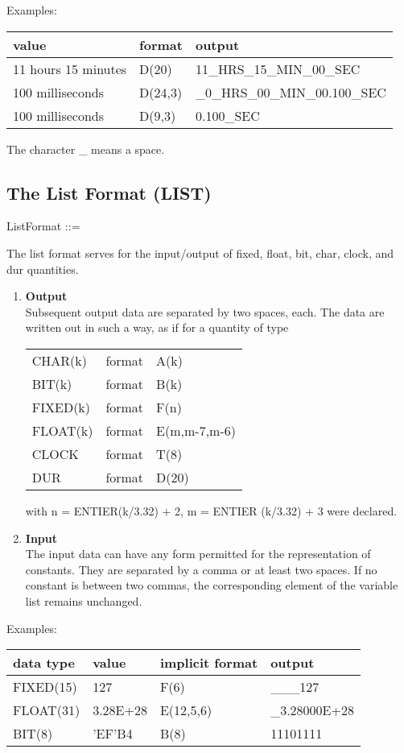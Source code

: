 Examples:

\begin{tabular}{lll}
value               & format  & output \\ \hline
11 hours 15 minutes & D(20)   & 11\_HRS\_15\_MIN\_00\_SEC \\
100 milliseconds    & D(24,3) & \_0\_HRS\_00\_MIN\_00.100\_SEC \\
100 milliseconds    & D(9,3) & 0.100\_SEC
\end{tabular}

The character \_ means a space.

\subsection{The List Format (LIST)}    %
\label{sec_dation_list_format}

ListFormat ::=\\

The list format serves for the input/output of fixed, float, bit, char,
clock, and dur quantities.
\begin{enumerate}
\item {\bf Output}\\
Subsequent output data are separated by two spaces, each. The data are
written out in such a way, as if for a quantity of type

\begin{tabular}{lll}
CHAR(k)  & format & A(k)\\
BIT(k)   & format & B(k)\\
FIXED(k) & format & F(n)\\
FLOAT(k) & format & E(m,m-7,m-6)\\
CLOCK    & format & T(8)\\
DUR      & format & D(20)
\end{tabular}

with n = ENTIER(k/3.32) + 2, m = ENTIER (k/3.32) + 3 were
declared.
\item {\bf Input}\\
The input data can have any form permitted for the representation of
constants. They are separated by a comma or at least two spaces. If no
constant is between two commas, the corresponding element of the
variable list remains unchanged.
\end{enumerate}

Examples:

\begin{tabular}{llll}
data type & value    & implicit format & output \\ \hline
FIXED(15) & 127      & F(6)            & \_\_\_127 \\
FLOAT(31) & 3.28E+28 & E(12,5,6)       & \_3.28000E+28\\
BIT(8)    & 'EF'B4   & B(8)            & 11101111
\end{tabular}


